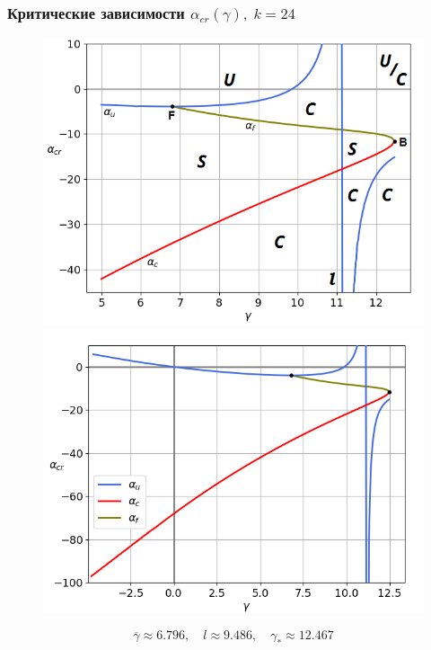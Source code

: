 \documentclass[fullscreen=true, unicode, bookmarks=false]{beamer}
\begin{document}
\begin{frame}
\frametitle{ Критические зависимости $ \alpha_{cr}(\gamma), \; k = 24 $ }

\begin{figure} 
\begin{minipage}[h]{0.49\linewidth}
\begin{center}
\includegraphics[scale=0.37]{scheme24.png} 
\end{center}
\end{minipage} 
\hfill
\begin{minipage}[h]{0.49\linewidth}
\begin{center}
\includegraphics[scale=0.37]{alphas_047.png}
\end{center}
\end{minipage} 
\end{figure}

$$ \overline{\gamma} \approx 6.796, \quad l \approx 9.486, \quad \gamma_* \approx 12.467 $$

\end{frame}
\end{document}
